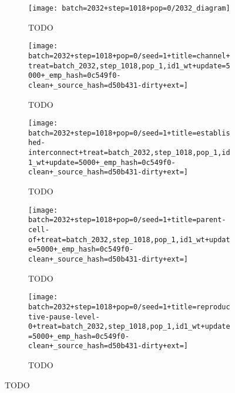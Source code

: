 \begin{figure}[!htbp]

\begin{center}
\begin{subfigure}[b]{\linewidth}
  \texttt{[image: batch=2032+step=1018+pop=0/2032\_diagram]}
  \caption{TODO}
  \label{fig:TODO}
\end{subfigure}
\begin{subfigure}[b]{0.33\linewidth}
  \texttt{[image: batch=2032+step=1018+pop=0/seed=1+title=channel+treat=batch\_2032,step\_1018,pop\_1,id1\_wt+update=5000+\_emp\_hash=0c549f0-clean+\_source\_hash=d50b431-dirty+ext=]}
  \caption{TODO}
  \label{fig:TODO}
\end{subfigure}
\begin{subfigure}[b]{0.33\linewidth}
  \texttt{[image: batch=2032+step=1018+pop=0/seed=1+title=established-interconnect+treat=batch\_2032,step\_1018,pop\_1,id1\_wt+update=5000+\_emp\_hash=0c549f0-clean+\_source\_hash=d50b431-dirty+ext=]}
  \caption{TODO}
  \label{fig:TODO}
\end{subfigure}
\begin{subfigure}[b]{0.33\linewidth}
  \texttt{[image: batch=2032+step=1018+pop=0/seed=1+title=parent-cell-of+treat=batch\_2032,step\_1018,pop\_1,id1\_wt+update=5000+\_emp\_hash=0c549f0-clean+\_source\_hash=d50b431-dirty+ext=]}
  \caption{TODO}
  \label{fig:TODO}
\end{subfigure}
\begin{subfigure}[b]{0.33\linewidth}
  \texttt{[image: batch=2032+step=1018+pop=0/seed=1+title=reproductive-pause-level-0+treat=batch\_2032,step\_1018,pop\_1,id1\_wt+update=5000+\_emp\_hash=0c549f0-clean+\_source\_hash=d50b431-dirty+ext=]}
  \caption{TODO}
  \label{fig:TODO}
\end{subfigure}
\caption{
TODO
}
\label{fig:case_study_2032}
\end{center}
\end{figure}
